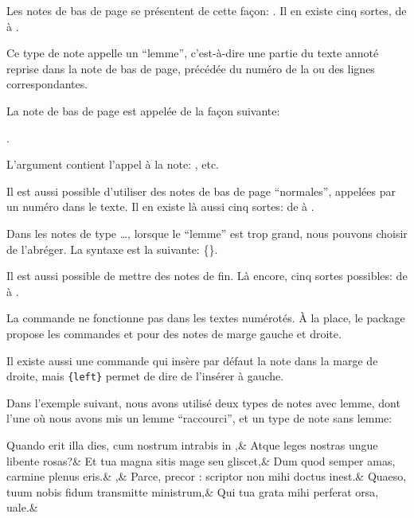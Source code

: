 Les notes de bas de page se présentent de cette façon:  . Il en existe cinq sortes, de  à .


Ce type de note appelle un \enquote{lemme}, c'est-à-dire une partie du texte annoté reprise dans la note de bas de page, précédée du numéro de la ou des lignes correspondantes. 

La note de bas de page est appelée de la façon suivante:  

. 

L'argument  contient l'appel à la note: ,  etc.

Il est aussi possible d'utiliser  des  notes de bas de page \enquote{normales}, appelées par un numéro dans le texte. Il  en existe là aussi cinq sortes: de  à .

Dans les notes de type \dots, lorsque le \enquote{lemme} est trop grand, nous pouvons choisir de l'abréger. La syntaxe est la suivante: 
\{\}. 

\begin{plusloins}
Il est aussi possible de mettre des notes de fin. Là encore, cinq sortes possibles:  de  à .

La commande  ne fonctionne pas dans les textes numérotés. À la place, le package propose les commandes  et  pour des notes de marge gauche et droite.

Il existe aussi une commande  qui insère par défaut la note dans la marge de droite, mais \verb={left}= permet de dire de l'insérer à gauche.
\end{plusloins} 

Dans l'exemple suivant, nous avons utilisé deux types de notes avec lemme, dont l'une où nous avons mis un lemme \enquote{raccourci}, et  un type de note sans lemme:


\begin{latexcode}
\stanza
Quando erit illa dies, cum nostrum intrabis in 
{},&
 Atque leges nostras ungue libente rosas?&
Et tua magna sitis mage seu 
{} gliscet,&
 Dum quod semper amas, carmine plenus eris.&
{},&
 Parce, precor : scriptor non mihi doctus inest.&
Quaeso, tuum nobis fidum transmitte ministrum,&
 Qui tua grata mihi perferat orsa, uale.\&
\end{latexcode}

